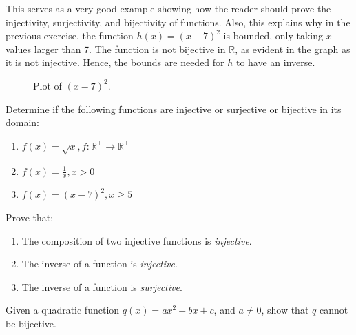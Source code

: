 \begin{remark}
  This serves as a very good example showing how the reader should prove the injectivity, surjectivity, and bijectivity of functions. Also, this explains why in the previous exercise, the function \(h(x)=(x-7)^2\) is bounded, only taking \(x\) values larger than 7. The function is not bijective in \(\mathbb{R}\), as evident in the graph as it is not injective. Hence, the bounds are needed for \(h\) to have an inverse.
\end{remark}
\begin{figure}
  \centering
  \caption{Plot of \((x-7)^2\).}
\end{figure}
\begin{problem}
  Determine if the following functions are injective or surjective or bijective in its domain:
  \begin{enumerate}[label=\alph*)]
    \item{\(f(x)=\sqrt{x}, f: \mathbb{R}^{+} \to \mathbb{R}^{+}\)}
    \item{\(f(x)=\frac{1}{x}, x>0\)}
    \item{\(f(x)=(x-7)^2, x \geq 5\)}
  \end{enumerate}
\end{problem}
\begin{problem}[1]
  Prove that:
  \begin{enumerate}[label=\alph*)]
    \item{The composition of two injective functions is \textit{injective}.}
    \item{The inverse of a function is \textit{injective}.}
    \item{The inverse of a function is \textit{surjective}.}
  \end{enumerate}
\end{problem}
\begin{problem}[1]
  Given a quadratic function \(q(x)=ax^2+bx+c\), and \(a\neq 0\), show that \(q\) cannot be bijective.
\end{problem}

